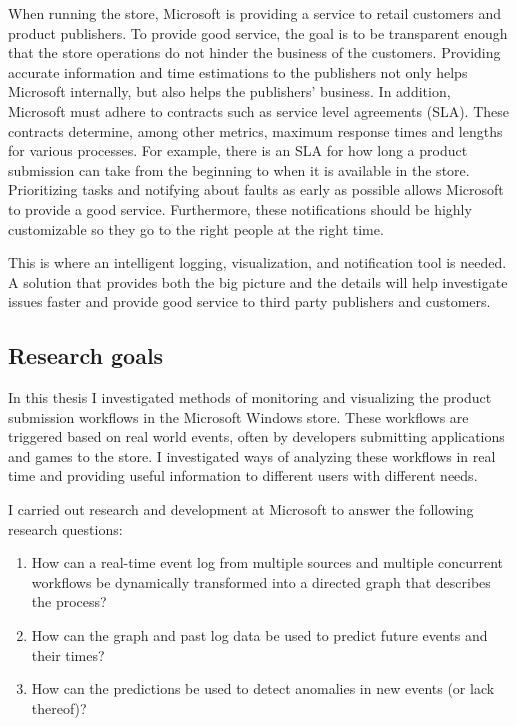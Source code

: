 \documentclass[english,12pt,a4paper,pdftex,sci,utf8]{aaltothesis}
\theoremstyle{definition}
\begin{document}
When running the store, Microsoft is providing a service to retail customers and product publishers.
To provide good service, the goal is to be transparent enough that the store operations do not hinder the
business of the customers. Providing accurate information and time estimations to the publishers
not only helps Microsoft internally, but also helps the publishers' business.
In addition, Microsoft must adhere to contracts such as
service level agreements (SLA). These contracts determine, among other metrics, 
maximum response times and lengths for various processes.
For example, there is an SLA for how long a product submission can take from the beginning to when it is available in the store.
Prioritizing tasks and notifying about faults as early as possible allows Microsoft to provide a good service. 
Furthermore, these notifications should be highly customizable so they go to the right people at the right time.

This is where an intelligent logging, visualization, and notification tool is needed. 
A solution that provides both the big picture and the details will help investigate issues faster and
provide good service to third party publishers and customers.

\subsection{Research goals}
In this thesis I investigated methods of monitoring and visualizing the product submission workflows in the Microsoft Windows store.
These workflows are triggered based on real world events, often by developers submitting applications and games to the store.
I investigated ways of analyzing these workflows in real time and providing useful information to different users with different needs. 

I carried out research and development at Microsoft to answer the following research questions:

\begin{enumerate}[label=RQ\arabic*]
    \item How can a real-time event log from multiple sources and multiple concurrent workflows be dynamically transformed into a directed graph that describes the process? 
    \item How can the graph and past log data be used to predict future events and their times?
    \item How can the predictions be used to detect anomalies in new events (or lack thereof)?
\end{enumerate}
\end{document}
